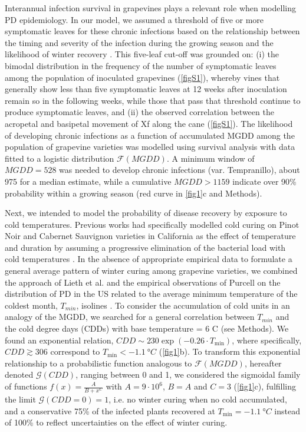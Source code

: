 Interannual infection survival in grapevines plays a relevant role when
modelling PD epidemiology. In our model, we assumed a threshold of five or more
symptomatic leaves for these chronic infections based on the relationship
between the timing and severity of the infection during the growing season and
the likelihood of winter recovery  \cite{Feil2001, Feil2003, Lieth2011}. This
five-leaf cut-off was grounded on: (i) the bimodal distribution in the
frequency of the number of symptomatic leaves among the population of
inoculated grapevines (\cref{figS1}), whereby vines that generally
show less than five symptomatic leaves at 12 weeks after inoculation remain so
in the following weeks, while those that pass that threshold continue to
produce symptomatic leaves, and (ii) the observed correlation between the
acropetal and basipetal movement of Xf along the cane (\cref{figS1}).
The likelihood of developing chronic infections as a function of accumulated
MGDD among the population of grapevine varieties was modelled using survival
analysis with data fitted to a logistic distribution $\mathcal{F}(MGDD)$. A
minimum window of $MGDD=528$ was needed to develop chronic infections (var.
Tempranillo), about 975 for a median estimate, while a cumulative $MGDD>1159$
indicate over 90\% probability within a growing season (red curve in
\cref{fig1}c and Methods).

Next, we intended to model the probability of disease recovery by exposure to
cold temperatures. Previous works had specifically modelled cold curing on
Pinot Noir and Cabernet Sauvignon varieties in California as the effect of
temperature and duration \cite{Lieth2011} by assuming a progressive elimination
of the bacterial load with cold temperatures \cite{Feil2003}. In the absence of
appropriate empirical data to formulate a general average pattern of winter
curing among grapevine varieties, we combined the approach of Lieth et al.
\cite{Lieth2011} and the empirical observations of Purcell on the distribution
of PD in the US related to the average minimum temperature of the coldest
month, $T_{min}$, isolines \cite{Anas2008}. To consider
the accumulation of cold units in an analogy of the MGDD, we searched for a
general correlation between $T_{min}$ and the cold degree days (CDDs) with base
temperature = $6$ \textdegree C (see Methods). We found an exponential
relation, $CDD \sim 230\exp(-0.26\cdot T_{\textrm{min}})$, where specifically,
$CDD\gtrsim306$ correspond to $T_{\textrm{min}}<\SI{-1.1}{\degree C}$
(\cref{fig1}b). To transform this exponential relationship to a probabilistic
function analogous to $\mathcal{F}(MGDD)$, hereafter denoted
$\mathcal{G}(CDD)$, ranging between 0 and 1, we considered the sigmoidal family
of functions $\displaystyle f(x)=\frac{A}{B+x^C}$ with $A=9\cdot 10^6$, $B=A$
and $C=3$ (\cref{fig1}c), fulfilling the limit $\mathcal{G}(CDD=0)=1$, i.e. no
winter curing when no cold accumulated, and a conservative 75\% of the infected
plants recovered at $T_{\textrm{min}}=\SI{-1.1}{\degree C}$ instead of 100\% to
reflect uncertainties on the effect of winter curing.

